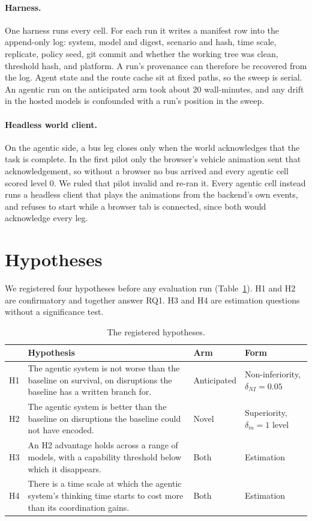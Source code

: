 \paragraph{Harness.}
\label{sec:eval:harness}
One harness runs every cell. For each run it writes a manifest row into the
append-only log: system, model and digest, scenario and hash, time scale,
replicate, policy seed, git commit and whether the working tree was clean,
threshold hash, and platform. A run's provenance can therefore be recovered
from the log. Agent state and the route cache sit at fixed paths, so the sweep
is serial. An agentic run on the anticipated arm took about 20 wall-minutes,
and any drift in the hosted models is confounded with a run's position in the
sweep.

\paragraph{Headless world client.} On the agentic side, a bus leg closes only
when the world acknowledges that the task is complete. In the first pilot only
the browser's vehicle animation sent that acknowledgement, so without a browser
no bus arrived and every agentic cell scored level 0. We ruled that pilot
invalid and re-ran it. Every agentic cell instead runs a headless client that plays
the animations from the backend's own events, and refuses to start while a
browser tab is connected, since both would acknowledge every leg.

\section{Hypotheses}
\label{sec:eval:hypotheses}

We registered four hypotheses before any evaluation run
(Table~\ref{tab:eval:hypotheses}). H1 and H2 are confirmatory and together
answer RQ1. H3 and H4 are estimation questions without a significance test.

\begin{table}[htbp]
\centering
\caption{The registered hypotheses.}
\label{tab:eval:hypotheses}
\small
\begin{tabularx}{\textwidth}{l>{\raggedright\arraybackslash}Xll}
\toprule
 & Hypothesis & Arm & Form \\
\midrule
H1 & The agentic system is not worse than the baseline on survival, on disruptions the baseline has a written branch for. & Anticipated & Non-inferiority, $\delta_{NI} = 0.05$ \\
H2 & The agentic system is better than the baseline on disruptions the baseline could not have encoded. & Novel & Superiority, $\delta_m = 1$ level \\
H3 & An H2 advantage holds across a range of models, with a capability threshold below which it disappears. & Both & Estimation \\
H4 & There is a time scale at which the agentic system's thinking time starts to cost more than its coordination gains. & Both & Estimation \\
\bottomrule
\end{tabularx}
\end{table}

